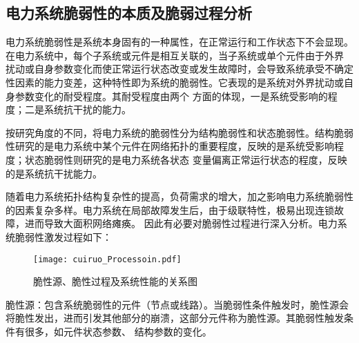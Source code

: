 


\subsection{电力系统脆弱性的本质及脆弱过程分析}
\label{sec:network}

电力系统脆弱性是系统本身固有的一种属性，在正常运行和工作状态下不会显现。在电力系统中，每个子系统或元件是相互关联的，当子系统或单个元件由于外界
扰动或自身参数变化而使正常运行状态改变或发生故障时，会导致系统承受不确定性因素的能力变差，这种特性即为系统的脆弱性。它表现的是系统对外界扰动或自身参数变化的耐受程度。其耐受程度由两个
方面的体现，一是系统受影响的程度；二是系统抗干扰的能力。


按研究角度的不同，将电力系统的脆弱性分为结构脆弱性和状态脆弱性。结构脆弱性研究的是电力系统中某个元件在网络拓扑的重要程度，反映的是系统受影响程度；状态脆弱性则研究的是电力系统各状态
变量偏离正常运行状态的程度，反映的是系统抗干扰能力。

随着电力系统拓扑结构复杂性的提高，负荷需求的增大，加之影响电力系统脆弱性的因素复杂多样。电力系统在局部故障发生后，由于级联特性，极易出现连锁故障，进而导致大面积网络瘫痪。
因此有必要对脆弱性过程进行深入分析。电力系统脆弱性激发过程如下：
\begin{figure}[H] %
  \centering
  \texttt{[image: cuiruo\_Processoin.pdf]}
  \caption{脆性源、脆性过程及系统性能的关系图}
  \label{fig:procession}
\end{figure}

脆性源：包含系统脆弱性的元件（节点或线路）。当脆弱性条件触发时，脆性源会将脆性发出，进而引发其他部分的崩溃，这部分元件称为脆性源。其脆弱性触发条件有很多，如元件状态参数、
结构参数的变化。


